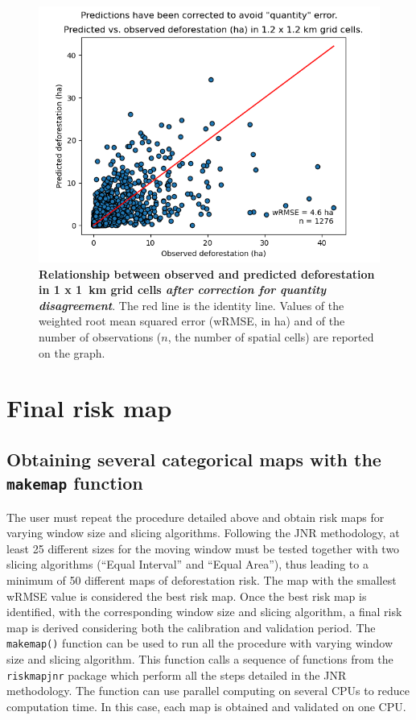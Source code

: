 \documentclass[paper=a4, 12pt, DIV=12]{scrartcl}
\begin{document}
\begin{figure}[H]
\centering
\includegraphics[width=0.8\linewidth]{outputs/pred_obs_corrected_steps.png}
\caption{\label{fig:org0c9a8a1}\textbf{Relationship between observed and predicted deforestation in 1 x 1 km grid cells \emph{after correction for quantity disagreement}}. The red line is the identity line. Values of the weighted root mean squared error (wRMSE, in ha) and of the number of observations (\(n\), the number of spatial cells) are reported on the graph.}
\end{figure}

\section{Final risk map}
\label{sec:org189726c}

\subsection{Obtaining several categorical maps with the \texttt{makemap} function}
\label{sec:org9ac5046}

The user must repeat the procedure detailed above and obtain risk maps for varying window size and slicing algorithms. Following the JNR methodology, at least 25 different sizes for the moving window must be tested together with two slicing algorithms (``Equal Interval'' and ``Equal Area''), thus leading to a minimum of 50 different maps of deforestation risk. The map with the smallest wRMSE value is considered the best risk map. Once the best risk map is identified, with the corresponding window size and slicing algorithm, a final risk map is derived considering both the calibration and validation period. The \texttt{makemap()} function can be used to run all the procedure with varying window size and slicing algorithm. This function calls a sequence of functions from the \texttt{riskmapjnr} package which perform all the steps detailed in the JNR methodology. The function can use parallel computing on several CPUs to reduce computation time. In this case, each map is obtained and validated on one CPU. 
\end{document}

